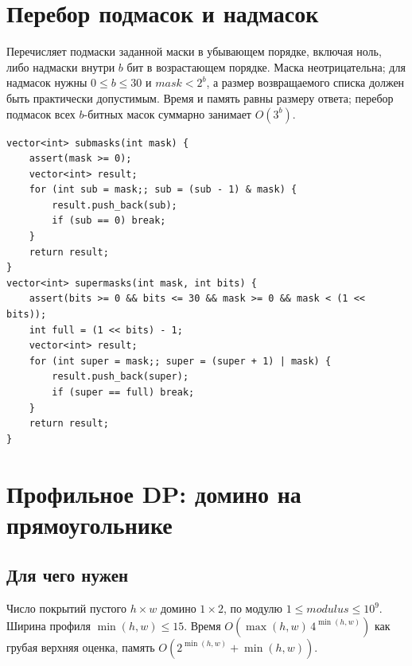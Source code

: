 \section{Перебор подмасок и надмасок}
Перечисляет подмаски заданной маски в убывающем порядке, включая ноль, либо надмаски внутри $b$ бит в возрастающем порядке.
Маска неотрицательна; для надмасок нужны $0\le b\le30$ и $mask<2^b$, а размер возвращаемого списка должен быть практически допустимым.
Время и память равны размеру ответа; перебор подмасок всех $b$-битных масок суммарно занимает $O(3^b)$.
\begin{lstlisting}[name=optimization_masks]
vector<int> submasks(int mask) {
    assert(mask >= 0);
    vector<int> result;
    for (int sub = mask;; sub = (sub - 1) & mask) {
        result.push_back(sub);
        if (sub == 0) break;
    }
    return result;
}
vector<int> supermasks(int mask, int bits) {
    assert(bits >= 0 && bits <= 30 && mask >= 0 && mask < (1 << bits));
    int full = (1 << bits) - 1;
    vector<int> result;
    for (int super = mask;; super = (super + 1) | mask) {
        result.push_back(super);
        if (super == full) break;
    }
    return result;
}
\end{lstlisting}
\fi

%

\iffalse
\section{Профильное DP: домино на прямоугольнике}
\subsection*{Для чего нужен}
Число покрытий пустого $h\times w$ домино $1\times2$, по модулю
$1\le modulus\le10^9$. Ширина профиля $\min(h,w)\le15$.
Время $O(\max(h,w)\,4^{\min(h,w)})$ как грубая верхняя оценка,
память $O(2^{\min(h,w)}+\min(h,w))$.
